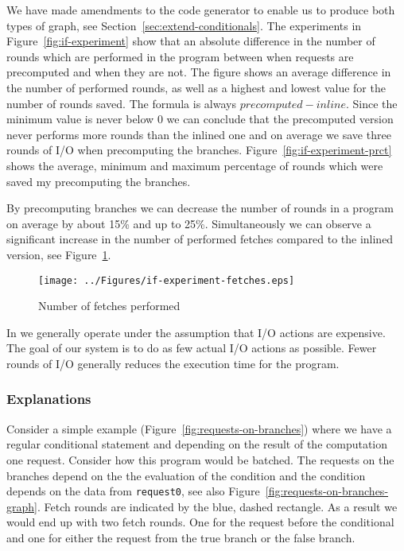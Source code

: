We have made amendments to the code generator to enable us to produce both types of graph, see Section~\ref{sec:extend-conditionals}.
The experiments in Figure~\ref{fig:if-experiment} show that an absolute difference in the number of rounds which are performed in the program between when requests are precomputed and when they are not.
The figure shows an average difference in the number of performed rounds, as well as a highest and lowest value for the number of rounds saved.
The formula is always $precomputed - inline$.
Since the minimum value is never below $0$ we can conclude that the precomputed version never performs more rounds than the inlined one and on average we save three rounds of I/O when precomputing the branches.
Figure~\ref{fig:if-experiment-prct} shows the average, minimum and maximum percentage of rounds which were saved my precomputing the branches.

By precomputing branches we can decrease the number of rounds in a program on average by about 15\% and up to 25\%.
Simultaneously we can observe a significant increase in the number of performed fetches compared to the inlined version, see Figure~\ref{fig:if-experiment-fetches}.

\begin{figure}[h]
    \texttt{[image: ../Figures/if-experiment-fetches.eps]}
    \caption{Number of fetches performed}
    \label{fig:if-experiment-fetches}
\end{figure}

In \yauhau{} we generally operate under the assumption that I/O actions are expensive.
The goal of our system is to do as few actual I/O actions as possible.
Fewer rounds of I/O generally reduces the execution time for the program.

\subsubsection{Explanations}

Consider a simple example (Figure~\ref{fig:requests-on-branches}) where we have a regular conditional statement and depending on the result of the computation one request.
Consider how this program would be batched.
The requests on the branches depend on the the evaluation of the condition and the condition depends on the data from \texttt{request0}, see also Figure~\ref{fig:requests-on-branches-graph}.
Fetch rounds are indicated by the blue, dashed rectangle.
As a result we would end up with two fetch rounds.
One for the request before the conditional and one for either the request from the true branch or the false branch.

